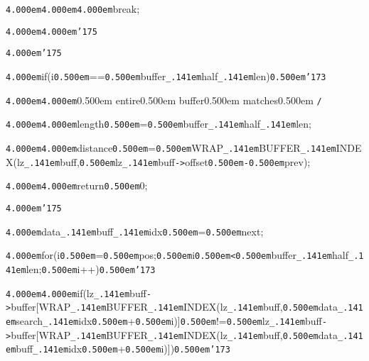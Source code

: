 \noindent
{}{\tt\mc \kern4.000em}{\tt\mc \kern4.000em}{\tt\mc \kern4.000em}break;

\noindent
{}{\tt\mc \kern4.000em}{\tt\mc \kern4.000em}{\tt\char'175}

\noindent
{}{\tt\mc \kern4.000em}{\tt\char'175}

\noindent
{}\hfill

\noindent
{}{\tt\mc \kern4.000em}if(i{\tt\mc \kern0.500em}=={\tt\mc \kern0.500em}buffer{\tt\_\kern.141em}half{\tt\_\kern.141em}len){\tt\mc \kern0.500em}{\tt\char'173}

\noindent
{}{\tt\mc \kern4.000em}{\tt\mc \kern4.000em}\rm\mc {\tt /}{\tt *}\kern0.500em entire\kern0.500em buffer\kern0.500em matches\kern0.500em {\tt *}{\tt /}
\tt\mc 

\noindent
{}{\tt\mc \kern4.000em}{\tt\mc \kern4.000em}{\tt *}length{\tt\mc \kern0.500em}={\tt\mc \kern0.500em}buffer{\tt\_\kern.141em}half{\tt\_\kern.141em}len;

\noindent
{}{\tt\mc \kern4.000em}{\tt\mc \kern4.000em}{\tt *}distance{\tt\mc \kern0.500em}={\tt\mc \kern0.500em}WRAP{\tt\_\kern.141em}BUFFER{\tt\_\kern.141em}INDEX(lz{\tt\_\kern.141em}buff,{\tt\mc \kern0.500em}lz{\tt\_\kern.141em}buff{\tt -}{\tt >}offset{\tt\mc \kern0.500em}{\tt -}{\tt\mc \kern0.500em}prev);

\noindent
{}{\tt\mc \kern4.000em}{\tt\mc \kern4.000em}return{\tt\mc \kern0.500em}0;

\noindent
{}{\tt\mc \kern4.000em}{\tt\char'175}

\noindent
{}\hfill

\noindent
{}{\tt\mc \kern4.000em}data{\tt\_\kern.141em}buff{\tt\_\kern.141em}idx{\tt\mc \kern0.500em}={\tt\mc \kern0.500em}next;

\noindent
{}\hfill

\noindent
{}{\tt\mc \kern4.000em}for(i{\tt\mc \kern0.500em}={\tt\mc \kern0.500em}pos;{\tt\mc \kern0.500em}i{\tt\mc \kern0.500em}{\tt <}{\tt\mc \kern0.500em}buffer{\tt\_\kern.141em}half{\tt\_\kern.141em}len;{\tt\mc \kern0.500em}i++){\tt\mc \kern0.500em}{\tt\char'173}

\noindent
{}{\tt\mc \kern4.000em}{\tt\mc \kern4.000em}if(lz{\tt\_\kern.141em}buff{\tt -}{\tt >}buffer[WRAP{\tt\_\kern.141em}BUFFER{\tt\_\kern.141em}INDEX(lz{\tt\_\kern.141em}buff,{\tt\mc \kern0.500em}data{\tt\_\kern.141em}search{\tt\_\kern.141em}idx{\tt\mc \kern0.500em}+{\tt\mc \kern0.500em}i)]{\tt\mc \kern0.500em}!={\tt\mc \kern0.500em}lz{\tt\_\kern.141em}buff{\tt -}{\tt >}buffer[WRAP{\tt\_\kern.141em}BUFFER{\tt\_\kern.141em}INDEX(lz{\tt\_\kern.141em}buff,{\tt\mc \kern0.500em}data{\tt\_\kern.141em}buff{\tt\_\kern.141em}idx{\tt\mc \kern0.500em}+{\tt\mc \kern0.500em}i)]){\tt\mc \kern0.500em}{\tt\char'173}


